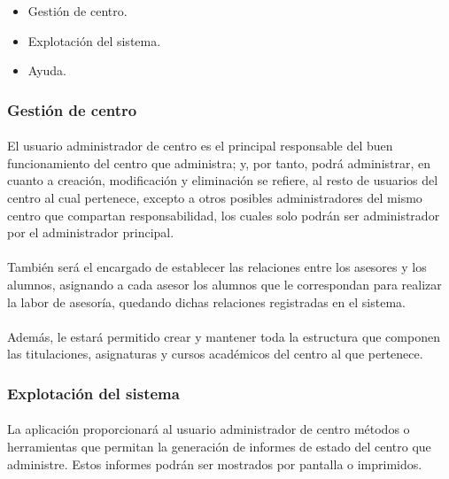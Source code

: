       \begin{itemize}
       \item Gestión de centro.
       \item Explotación del sistema.
       \item Ayuda.
      \end{itemize}

      \subsubsection{Gestión de centro}

      \paragraph{}El usuario administrador de centro es el principal responsable
      del buen funcionamiento del centro que administra; y, por tanto, podrá
      administrar, en cuanto a creación, modificación y eliminación se refiere,
      al resto de usuarios del centro al cual pertenece, excepto a otros
      posibles administradores del mismo centro que compartan responsabilidad,
      los cuales solo podrán ser administrador por el administrador principal.

      \paragraph{}También será el encargado de establecer las relaciones entre
      los asesores y los alumnos, asignando a cada asesor los alumnos que le
      correspondan para realizar la labor de asesoría, quedando dichas
      relaciones registradas en el sistema.

      \paragraph{}Además, le estará permitido crear y mantener toda la
      estructura que componen las titulaciones, asignaturas y cursos
      académicos del centro al que pertenece.

      \subsubsection{Explotación del sistema}

      \paragraph{}La aplicación proporcionará al usuario administrador de centro
      métodos o herramientas que permitan la generación de informes de estado
      del centro que administre. Estos informes podrán ser mostrados por
      pantalla o imprimidos.

